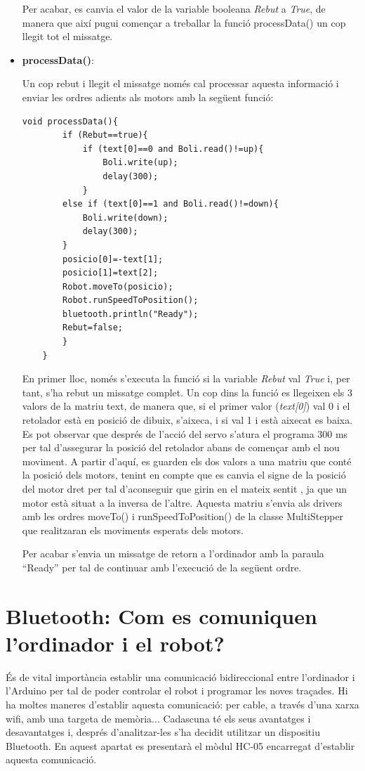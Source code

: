 \begin{itemize}
	Per acabar, es canvia el valor de la variable booleana \emph{Rebut} a \emph{True}, de manera que així pugui començar a treballar la funció processData() un cop llegit tot el missatge. 
	
	\item \textbf{processData()}:
	
	Un cop rebut i llegit el missatge només cal processar aquesta informació i enviar les ordres adients als motors amb la següent funció:
	
	\begin{lstlisting}[style=Arduino]
	void processData(){
		if (Rebut==true){
			if (text[0]==0 and Boli.read()!=up){
				Boli.write(up);
				delay(300);
			}
		else if (text[0]==1 and Boli.read()!=down){
			Boli.write(down);
			delay(300);
		}
		posicio[0]=-text[1];
		posicio[1]=text[2];
		Robot.moveTo(posicio);
		Robot.runSpeedToPosition();
		bluetooth.println("Ready");
		Rebut=false; 
		}
	}
	\end{lstlisting}
	
	En primer lloc, només s’executa la funció si la variable \emph{Rebut} val \emph{True} i, per tant, s’ha rebut un missatge complet. Un cop dins la funció es llegeixen els 3 valors de la matriu text, de manera que, si el primer valor (\emph{text[0]}) val 0 i el retolador està en posició de dibuix, s’aixeca, i si val 1 i està aixecat es baixa. Es pot observar que després de l’acció del servo s’atura el programa 300 ms per tal d’assegurar la posició del retolador abans de començar amb el nou moviment. A partir d’aquí, es guarden els dos valors a una matriu que conté la posició dels motors, tenint en compte que es canvia el signe de la posició del motor dret per tal d’aconseguir que girin en el mateix sentit , ja que un motor està situat a la inversa de l’altre. Aquesta matriu s’envia als drivers amb les ordres moveTo() i runSpeedToPosition() de la classe MultiStepper que realitzaran els moviments esperats dels motors. 
	
	Per acabar s’envia un missatge de retorn a l’ordinador amb la paraula “Ready” per tal de continuar amb l’execució de la següent ordre. 
	
	
\end{itemize}

\section{Bluetooth: Com es comuniquen l'ordinador i el robot?}

És de vital importància establir una comunicació bidireccional entre l’ordinador i l’Arduino per tal de poder controlar el robot i programar les noves traçades. Hi ha moltes maneres d’establir aquesta comunicació: per cable, a través d’una xarxa wifi, amb una targeta de memòria... Cadascuna té els seus avantatges i desavantatges i, després d’analitzar-les s’ha decidit utilitzar un dispositiu Bluetooth. En aquest apartat es presentarà el mòdul HC-05 encarregat d’establir aquesta comunicació.

